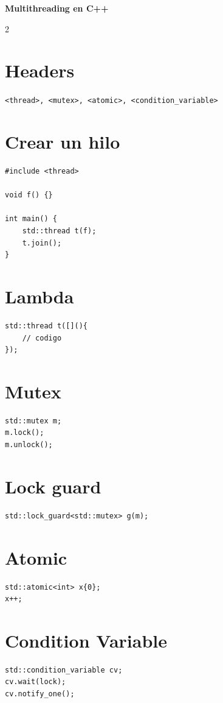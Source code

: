 \documentclass[a4paper,10pt]{article}
\begin{document}
\begin{center}
{\Large \textbf{Multithreading en C++}}
\end{center}

\begin{multicols}{2}

\section*{Headers}
\texttt{<thread>, <mutex>, <atomic>, <condition\_variable>}

\section*{Crear un hilo}
\begin{lstlisting}
#include <thread>

void f() {}

int main() {
    std::thread t(f);
    t.join();
}
\end{lstlisting}

\section*{Lambda}
\begin{lstlisting}
std::thread t([](){
    // codigo
});
\end{lstlisting}

\section*{Mutex}
\begin{lstlisting}
std::mutex m;
m.lock();
m.unlock();
\end{lstlisting}

\section*{Lock guard}
\begin{lstlisting}
std::lock_guard<std::mutex> g(m);
\end{lstlisting}

\section*{Atomic}
\begin{lstlisting}
std::atomic<int> x{0};
x++;
\end{lstlisting}

\section*{Condition Variable}
\begin{lstlisting}
std::condition_variable cv;
cv.wait(lock);
cv.notify_one();
\end{lstlisting}

\end{multicols}
\end{document}
